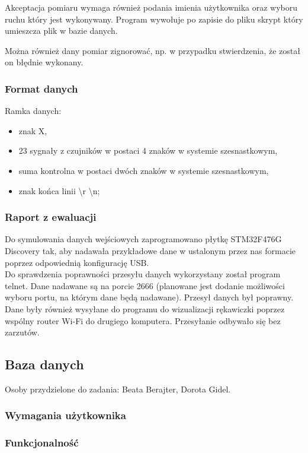 \documentclass{article}
\begin{document}
Akceptacja pomiaru wymaga również podania imienia użytkownika oraz wyboru ruchu który jest wykonywany. Program wywołuje po zapisie do pliku skrypt który umieszcza plik w bazie danych.

Można również dany pomiar zignorować, np. w przypadku stwierdzenia, że został on błędnie wykonany.

\subsubsection{Format danych}
Ramka danych:
\begin{itemize}
    \item znak X,
    \item 23 sygnały z czujników w postaci 4 znaków w systemie szesnastkowym,
    \item suma kontrolna w postaci dwóch znaków w systemie szesnastkowym,
    \item znak końca linii \backslash r \backslash n;
\end{itemize}

\subsubsection{Raport z ewaluacji}
Do symulowania danych wejściowych zaprogramowano płytkę STM32F476G Discovery tak, aby nadawała przykładowe dane w ustalonym przez nas formacie poprzez odpowiednią konfigurację USB. \\
Do sprawdzenia poprawności przesyłu danych wykorzystany został program telnet. Dane nadawane są na porcie 2666 (planowane jest dodanie możliwości wyboru portu, na którym dane będą nadawane). Przesył danych był poprawny. \\
Dane były również wysyłane do programu do wizualizacji rękawiczki poprzez wspólny router Wi-Fi do drugiego komputera. Przesyłanie odbywało się bez zarzutów.

\subsection{Baza danych}
Osoby przydzielone do zadania: Beata Berajter, Dorota Gidel.
\subsubsection{Wymagania użytkownika}

\subsubsection{Funkcjonalność}
\end{document}
